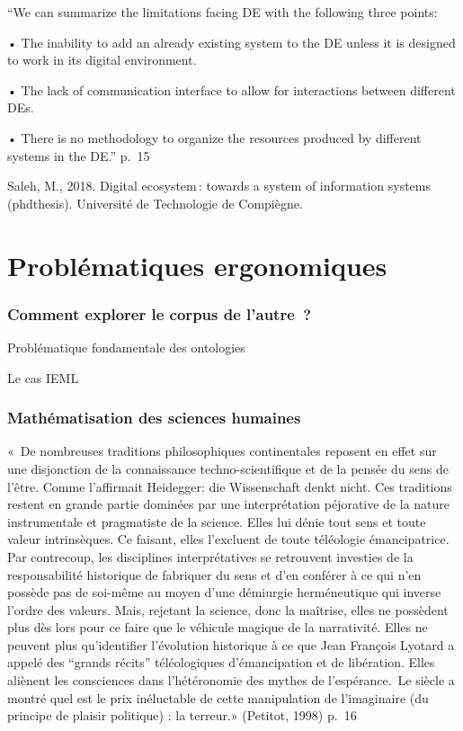 \documentclass[
  a4paper,
  DIV=11,
  numbers=noendperiod]{scrreprt}
\begin{document}
``We can summarize the limitations facing DE with the following three
points:

• The inability to add an already existing system to the DE unless it is
designed to work in its digital environment.

• The lack of communication interface to allow for interactions between
different DEs.

• There is no methodology to organize the resources produced by
different systems in the DE.'' p.~15

Saleh, M., 2018. Digital ecosystem\,: towards a system of information
systems (phdthesis). Université de Technologie de Compiègne.

\chapter{Problématiques ergonomiques}\label{sec-problemesErgo}

\subsection{Comment explorer le corpus de
l'autre~?}\label{comment-explorer-le-corpus-de-lautre}

Problématique fondamentale des ontologies

Le cas IEML

\subsection{Mathématisation des sciences
humaines}\label{mathuxe9matisation-des-sciences-humaines}

«~De nombreuses traditions philosophiques continentales reposent en
effet sur une disjonction de la connaissance techno-scientifique et de
la pensée du sens de l'être. Comme l'affirmait Heidegger: die
Wissenschaft denkt nicht. Ces traditions restent en grande partie
dominées par une interprétation péjorative de la nature instrumentale et
pragmatiste de la science. Elles lui dénie tout sens et toute valeur
intrinsèques. Ce faisant, elles l'excluent de toute téléologie
émancipatrice. Par contrecoup, les disciplines interprétatives se
retrouvent investies de la responsabilité historique de fabriquer du
sens et d'en conférer à ce qui n'en possède pas de soi-même au moyen
d'une démiurgie herméneutique qui inverse l'ordre des valeurs. Mais,
rejetant la science, donc la maîtrise, elles ne possèdent plus dès lors
pour ce faire que le véhicule magique de la narrativité. Elles ne
peuvent plus qu'identifier l'évolution historique à ce que Jean François
Lyotard a appelé des ``grands récits'' téléologiques d'émancipation et
de libération. Elles aliènent les consciences dans l'hétéronomie des
mythes de l'espérance.~Le siècle a montré quel est le prix inéluctable
de cette manipulation de l'imaginaire (du principe de plaisir politique)
: la terreur.» (Petitot, 1998) p.~16
\end{document}
